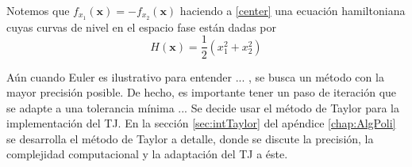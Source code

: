 Notemos que $f_{x_1}(\mathbf{x}) = -f_{x_2}(\mathbf{x})$ haciendo a \ref{center} una ecuación hamiltoniana cuyas curvas de nivel en el espacio fase están dadas por
\begin{equation*}
H(\mathbf{x}) = \frac{1}{2} \left( x_1^2 + x_2^2 \right)
\end{equation*} 


Aún cuando Euler es ilustrativo para entender ... , se busca un método con la mayor precisión posible. De hecho, es importante tener un paso de iteración que se adapte a una tolerancia mínima ... Se decide usar el método de Taylor para la implementación del TJ. En la sección \ref{sec:intTaylor} del apéndice \ref{chap:AlgPoli} se desarrolla el método de Taylor a detalle, donde se discute la precisión, la complejidad computacional y la adaptación del TJ a éste.



 